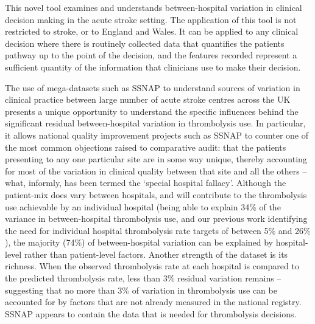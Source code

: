 This novel tool examines and understands between-hospital variation in clinical decision making in the acute stroke setting. The application of this tool is not restricted to stroke, or to England and Wales. It can be applied to any clinical decision where there is routinely collected data that quantifies the patients pathway up to the point of the decision, and the features recorded represent a sufficient quantity of the information that clinicians use to make their decision.

The use of mega-datasets such as SSNAP to understand sources of variation in clinical practice between large number of acute stroke centres across the UK presents a unique opportunity to understand the specific influences behind the significant residual between-hospital variation in thrombolysis use.  In particular, it allows national quality improvement projects such as SSNAP to counter one of the most common objections raised to comparative audit: that the patients presenting to any one particular site are in some way unique, thereby accounting for most of the variation in clinical quality between that site and all the others – what, informly, has been termed the `special hospital fallacy'. Although the patient-mix does vary between hospitals, and will contribute to the thrombolysis use achievable by an individual hospital (being able to explain 34\% of the variance in between-hospital thrombolysis use, and our previous work identifying the need for individual hospital thrombolysis rate targets of between 5\% and 26\% \cite{allen_use_2022}), the majority (74\%) of between-hospital variation can be explained by hospital-level rather than patient-level factors. Another strength of the dataset is its richness. When the observed thrombolysis rate at each hospital is compared to the predicted thrombolysis rate, less than 3\% residual variation remains – suggesting that no more than 3\% of variation in thrombolysis use can be accounted for by factors that are not already measured in the national registry. SSNAP appears to contain the data that is needed for thrombolysis decisions. 

